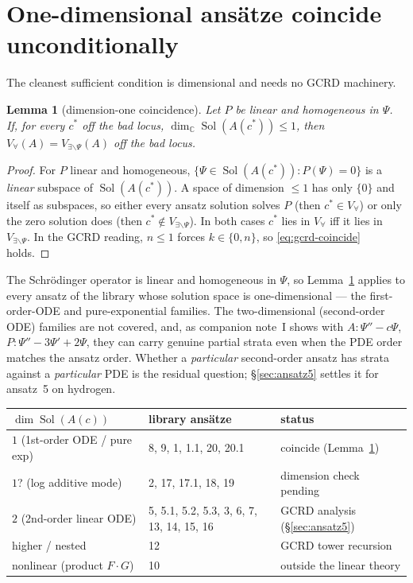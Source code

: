 \documentclass[11pt]{article}
\DeclareMathOperator{\Sol}{Sol}
\newcommand{\Vall}{V_{\forall}}
\newcommand{\Vex}{V_{\exists\backslash\Psi}}
\newtheorem{lemma}{Lemma}
\begin{document}
\section{One-dimensional ans\"atze coincide unconditionally}

The cleanest sufficient condition is dimensional and needs no GCRD machinery.

\begin{lemma}[dimension-one coincidence]
\label{lem:dim1}
Let $P$ be linear and homogeneous in $\Psi$. If, for every $c^*$ off the bad
locus, $\dim_{\mathbb C}\Sol(A(c^*))\le 1$, then $\Vall(A)=\Vex(A)$ off the bad
locus.
\end{lemma}

\begin{proof}
For $P$ linear and homogeneous, $\{\Psi\in\Sol(A(c^*)):P(\Psi)=0\}$ is a
\emph{linear} subspace of $\Sol(A(c^*))$. A space of dimension $\le 1$ has only
$\{0\}$ and itself as subspaces, so either every ansatz solution solves $P$
(then $c^*\in\Vall$) or only the zero solution does (then $c^*\notin\Vex$). In
both cases $c^*$ lies in $\Vall$ iff it lies in $\Vex$. In the GCRD reading,
$n\le 1$ forces $k\in\{0,n\}$, so \eqref{eq:gcrd-coincide} holds.
\end{proof}

The Schr\"odinger operator is linear and homogeneous in $\Psi$, so
Lemma~\ref{lem:dim1} applies to every ansatz of the library whose solution
space is one-dimensional --- the first-order-ODE and pure-exponential families.
The two-dimensional (second-order ODE) families are not covered, and, as
companion note~I shows with $A:\Psi''-c\Psi$, $P:\Psi''-3\Psi'+2\Psi$, they can
carry genuine partial strata even when the PDE order matches the ansatz order.
Whether a \emph{particular} second-order ansatz has strata against a
\emph{particular} PDE is the residual question; \S\ref{sec:ansatz5} settles it
for ansatz~5 on hydrogen.

\begin{center}
\begin{tabular}{@{}lll@{}}
\toprule
$\dim\Sol(A(c))$ & library ans\"atze & status \\
\midrule
$1$ (1st-order ODE / pure exp) & 8, 9, 1, 1.1, 20, 20.1 & coincide (Lemma~\ref{lem:dim1}) \\
$1$? (log additive mode) & 2, 17, 17.1, 18, 19 & dimension check pending \\
$2$ (2nd-order linear ODE) & 5, 5.1, 5.2, 5.3, 3, 6, 7, 13, 14, 15, 16 & GCRD analysis (\S\ref{sec:ansatz5}) \\
higher / nested & 12 & GCRD tower recursion \\
nonlinear (product $F\!\cdot\!G$) & 10 & outside the linear theory \\
\bottomrule
\end{tabular}
\end{center}
\end{document}
